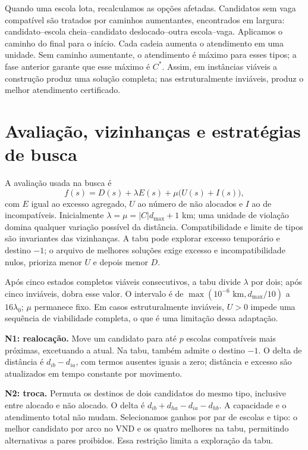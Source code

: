 \documentclass[12pt]{article}
\begin{document}
Quando uma escola lota, recalculamos as opções afetadas. Candidatos sem vaga compatível são tratados por caminhos aumentantes, encontrados em largura: candidato--escola cheia--candidato deslocado--outra escola--vaga. Aplicamos o caminho do final para o início. Cada cadeia aumenta o atendimento em uma unidade. Sem caminho aumentante, o atendimento é máximo para esses tipos; a fase anterior garante que esse máximo é $C^*$. Assim, em instâncias viáveis a construção produz uma solução completa; nas estruturalmente inviáveis, produz o melhor atendimento certificado.

\section{Avaliação, vizinhanças e estratégias de busca}
A avaliação usada na busca é
\begin{equation}
 f(s)=D(s)+\lambda E(s)+\mu\bigl(U(s)+I(s)\bigr),
\end{equation}
com $E$ igual ao excesso agregado, $U$ ao número de não alocados e $I$ ao de incompatíveis. Inicialmente $\lambda=\mu=|C|d_{\max}+1$ km; uma unidade de violação domina qualquer variação possível da distância. Compatibilidade e limite de tipos são invariantes das vizinhanças. A tabu pode explorar excesso temporário e destino $-1$; o arquivo de melhores soluções exige excesso e incompatibilidade nulos, prioriza menor $U$ e depois menor $D$.

Após cinco estados completos viáveis consecutivos, a tabu divide $\lambda$ por dois; após cinco inviáveis, dobra esse valor. O intervalo é de $\max(10^{-6}\text{ km},d_{\max}/10)$ a $16\lambda_0$; $\mu$ permanece fixo. Em casos estruturalmente inviáveis, $U>0$ impede uma sequência de viabilidade completa, o que é uma limitação dessa adaptação.

\textbf{N1: realocação.} Move um candidato para até $p$ escolas compatíveis mais próximas, excetuando a atual. Na tabu, também admite o destino $-1$. O delta de distância é $d_{ib}-d_{ia}$, com termos ausentes iguais a zero; distância e excesso são atualizados em tempo constante por movimento.

\textbf{N2: troca.} Permuta os destinos de dois candidatos do mesmo tipo, inclusive entre alocado e não alocado. O delta é $d_{ib}+d_{ha}-d_{ia}-d_{hb}$. A capacidade e o atendimento total não mudam. Selecionamos ganhos por par de escolas e tipo: o melhor candidato por arco no VND e os quatro melhores na tabu, permitindo alternativas a pares proibidos. Essa restrição limita a exploração da tabu.
\end{document}
